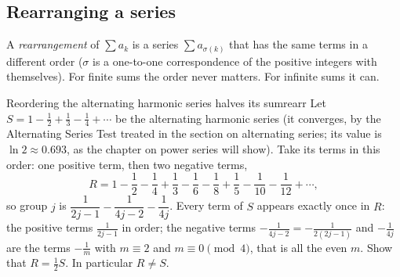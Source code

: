 \documentclass[11pt]{article}
\begin{document}
\subsection*{Rearranging a series}

A \emph{rearrangement} of $\sum a_k$ is a series $\sum a_{\sigma(k)}$ that has the same terms in a different order ($\sigma$ is a one-to-one correspondence of the positive integers with themselves). For finite sums the order never matters. For infinite sums it can.

\begin{exmp}{Reordering the alternating harmonic series halves its sum}{rearr}
Let $S=1-\frac12+\frac13-\frac14+\cdots$ be the alternating harmonic series (it converges, by the Alternating Series Test treated in the section on alternating series; its value is $\ln2\approx0.693$, as the chapter on power series will show). Take its terms in this order: one positive term, then two negative terms,
\[
R=1-\frac12-\frac14+\frac13-\frac16-\frac18+\frac15-\frac1{10}-\frac1{12}+\cdots,
\]
so group $j$ is $\dfrac1{2j-1}-\dfrac1{4j-2}-\dfrac1{4j}$. Every term of $S$ appears exactly once in $R$: the positive terms $\frac1{2j-1}$ in order; the negative terms $-\frac1{4j-2}=-\frac1{2(2j-1)}$ and $-\frac1{4j}$ are the terms $-\frac1m$ with $m\equiv2$ and $m\equiv0\pmod4$, that is all the even $m$. Show that $R=\frac12S$. In particular $R\ne S$.


\end{exmp}
\end{document}

